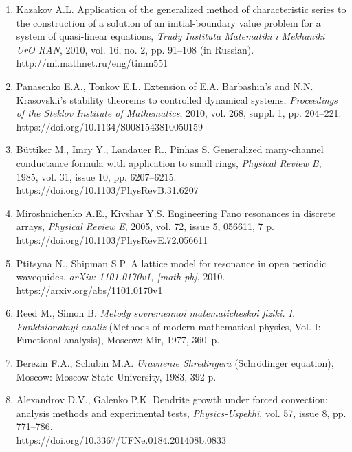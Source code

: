 \documentclass[12pt,a4paper,twoside]{article}  %
\begin{document}
\begin{enumerate}
\item
Kazakov A.L.
Application of the generalized method of characteristic series to the construction of a solution of an initial-boundary value problem for a system of quasi-linear equations,
{\it Trudy Instituta Matematiki i Mekhaniki UrO RAN}, 2010, vol. 16, no. 2, pp. 91--108 (in Russian). \\
http://mi.mathnet.ru/eng/timm551


\item
Panasenko E.A., Tonkov E.L. Extension of E.A. Barbashin’s and N.N. Krasovskii’s stability theorems to controlled dynamical systems, {\it Proceedings of the Steklov Institute of Mathematics}, 2010, vol. 268, suppl. 1, pp. 204--221.
https://doi.org/10.1134/S0081543810050159

\item
B\"uttiker M., Imry Y., Landauer R., Pinhas S. Generalized many-channel conductance formula with application to small rings,
{\it Physical Review B}, 1985, vol. 31, issue 10, pp. 6207--6215.\\
https://doi.org/10.1103/PhysRevB.31.6207

\item
Miroshnichenko A.E., Kivshar Y.S.
Engineering Fano resonances in discrete arrays, {\it Physical Review E}, 2005, vol. 72, issue 5, 056611, 7 p.
https://doi.org/10.1103/PhysRevE.72.056611

\item
Ptitsyna N., Shipman S.P. A lattice model for resonance in open periodic wavequides,  {\it arXiv: 1101.0170v1, [math-ph]}, 2010.
https://arxiv.org/abs/1101.0170v1

\item
Reed M., Simon B. {\it Metody sovremennoi matematicheskoi fiziki. I. Funktsionalnyi analiz} (Methods of modern mathematical physics, Vol. I: Functional analysis), Moscow: Mir, 1977, 360~p.

\item
Berezin F.A., Schubin M.A.
{\it Uravnenie Shredingera} (Schr\"odinger equation), Moscow:
Moscow State University, 1983, 392 p.


\item
Alexandrov D.V., Galenko P.K.
Dendrite growth under forced convection: analysis methods and experimen\-tal tests, {\it Physics-Uspekhi}, vol. 57, issue 8, pp. 771--786.\\
https://doi.org/10.3367/UFNe.0184.201408b.0833


\end{enumerate}
\end{document}
